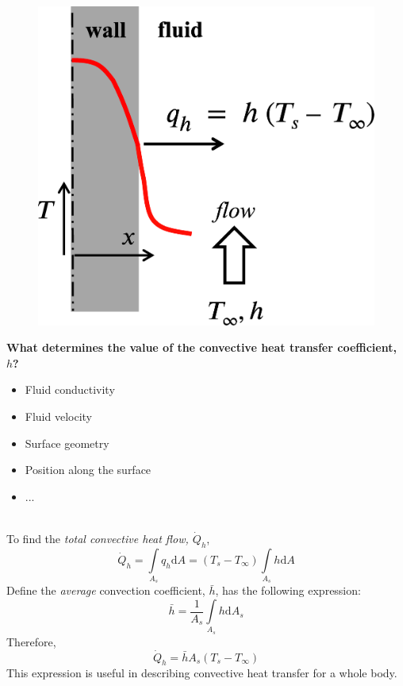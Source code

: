 \documentclass[12pt, a4paper]{article}
\begin{document}
\begin{minipage}{.4\textwidth}
    \begin{figure}[H]
    \centering
    \includegraphics[width=.9\textwidth]{img/convective_heat_transfer.eps}
    \end{figure}
\end{minipage}\hfill
\begin{minipage}{.6\textwidth}
\textbf{What determines the value of the convective heat transfer coefficient, $h$?}
\begin{itemize}
    \item Fluid conductivity
    \item Fluid velocity
    \item Surface geometry
    \item Position along the surface
    \item ...
\end{itemize}
\end{minipage}
\ \\

To find the \emph{total convective heat flow, $\dot{Q}_{h}$},
\[
    \dot{Q}_{h} = \int\limits_{A_{s}} q_{h}\mathrm{d}A = (T_{s}-T_{\infty})\int\limits_{A_{s}}h\mathrm{d}A
\]
Define the \textit{average} convection coefficient, $\bar{h}$, has the following expression:
\[
    \bar{h} = \frac{1}{A_{s}}\int\limits_{A_{s}}h\mathrm{d}A_{s}
\]
Therefore,
\[
    \dot{Q}_{h} = \bar{h}A_{s}(T_{s}-T_{\infty})
\]
This expression is useful in describing convective heat transfer for a whole body.
\end{document}
